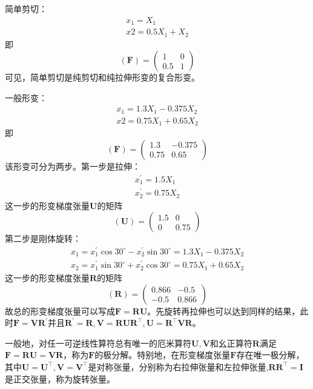 \documentclass[main.tex]{subfiles}
\begin{document}
\begin{example}
简单剪切：
\[\begin{array}{l}
x_1=X_1\\
x2=0.5X_1+X_2
\end{array}\]
即
\[\left(\mathbf{F}\right)=\left(\begin{array}{cc}1&0\\0.5&1\end{array}\right)\]
可见，简单剪切是纯剪切和纯拉伸形变的复合形变。

一般形变：
\[\begin{array}{l}
x_1=1.3X_1-0.375X_2\\
x2=0.75X_1+0.65X_2
\end{array}\]
即
\[\left(\mathbf{F}\right)=\left(\begin{array}{cc}1.3&-0.375\\0.75&0.65\end{array}\right)\]
该形变可分为两步。第一步是拉伸：
\[\begin{array}{l}
x^\prime_1=1.5X_1\\
x^\prime_2=0.75X_2
\end{array}\]
这一步的形变梯度张量$\mathbf{U}$的矩阵
\[\left(\mathbf{U}\right)=\left(\begin{array}{cc}1.5&0\\0&0.75\end{array}\right)\]
第二步是刚体旋转：
\[\begin{array}{l}
x_1=x^\prime_1\cos30^\circ-x^\prime_2\sin30^\circ=1.3X_1-0.375X_2\\
x_2=x^\prime_1\sin30^\circ+x^\prime_2\cos30^\circ=0.75X_1+0.65X_2
\end{array}\]
这一步的形变梯度张量$\mathbf{R}$的矩阵
\[\left(\mathbf{R}\right)=\left(\begin{array}{cc}0.866&-0.5\\-0.5&0.866\end{array}\right)\]
故总的形变梯度张量可以写成$\mathbf{F}=\mathbf{RU}$。先旋转再拉伸也可以达到同样的结果，此时$\mathbf{F}=\mathbf{VR}^\prime$并且$\mathbf{R}^\prime=\mathbf{R},\mathbf{V}=\mathbf{RUR}^\intercal,\mathbf{U}=\mathbf{R}^\intercal\mathbf{VR}$。
\end{example}

一般地，对任一可逆线性算符总有唯一的厄米算符$\mathbf{U},\mathbf{V}$和幺正算符$\mathbf{R}$满足$\mathbf{F}=\mathbf{RU}=\mathbf{VR}$，称为$\mathbf{F}$的极分解。特别地，在形变梯度张量$\mathbf{F}$存在唯一极分解，其中$\mathbf{U}=\mathbf{U}^\intercal,\mathbf{V}=\mathbf{V}^\intercal$是对称张量，分别称为右拉伸张量和左拉伸张量,$\mathbf{RR}^\intercal=\mathbf{I}$是正交张量，称为旋转张量。
\end{document}

